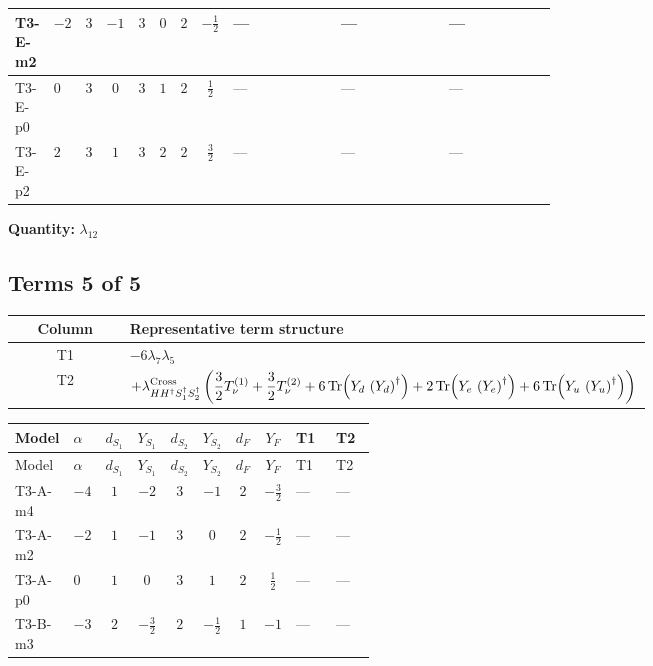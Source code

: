 \documentclass[8pt]{article}
\begin{document}
\begin{landscape}
\begin{longtable}{@{}llcccccc >{\raggedright\arraybackslash}p{0.21\linewidth} >{\raggedright\arraybackslash}p{0.21\linewidth} >{\raggedright\arraybackslash}p{0.21\linewidth}@{}}
\midrule
T3-E-m2 & $-2$ & $3$ & $-1$ & $3$ & $0$ & $2$ & $-\frac{1}{2}$ & --- & --- & --- \\
\midrule
T3-E-p0 & $0$ & $3$ & $0$ & $3$ & $1$ & $2$ & $\frac{1}{2}$ & --- & --- & --- \\
\midrule
T3-E-p2 & $2$ & $3$ & $1$ & $3$ & $2$ & $2$ & $\frac{3}{2}$ & --- & --- & --- \\
\midrule
\bottomrule
\end{longtable}
\clearpage
\noindent\textbf{Quantity: }$\lambda_{12}$\par\smallskip
\subsection*{Terms 5 of 5}
\begin{center}
\begin{tabular}{@{}c >{\raggedright\arraybackslash}p{0.82\linewidth}@{}}
\toprule
Column & Representative term structure \\
\midrule
T1 & \(\displaystyle -6 {\lambda_{7}} {\lambda_5}\) \\
\midrule
T2 & \(\displaystyle +{\lambda_{H H^\dagger S_1^\dagger S_2^\dagger}^{\rm Cross}} \left(\frac{3}{2} T_{\nu}^{(1)}+\frac{3}{2} T_{\nu}^{(2)}+6 \operatorname{Tr}\!\left({Y_d}\,\left({Y_d}\right)^{\dagger}\right)+2 \operatorname{Tr}\!\left({Y_e}\,\left({Y_e}\right)^{\dagger}\right)+6 \operatorname{Tr}\!\left({Y_u}\,\left({Y_u}\right)^{\dagger}\right)\right)\) \\
\midrule
\bottomrule
\end{tabular}
\end{center}
\smallskip
\tiny
\begin{longtable}{@{}llcccccc >{\raggedright\arraybackslash}p{0.21\linewidth} >{\raggedright\arraybackslash}p{0.21\linewidth}@{}}
\toprule
Model & $\alpha$ & $d_{S_1}$ & $Y_{S_1}$ & $d_{S_2}$ & $Y_{S_2}$ & $d_F$ & $Y_F$ & T1 & T2 \\
\midrule
\endfirsthead
\toprule
Model & $\alpha$ & $d_{S_1}$ & $Y_{S_1}$ & $d_{S_2}$ & $Y_{S_2}$ & $d_F$ & $Y_F$ & T1 & T2 \\
\midrule
\endhead
T3-A-m4 & $-4$ & $1$ & $-2$ & $3$ & $-1$ & $2$ & $-\frac{3}{2}$ & --- & --- \\
\midrule
T3-A-m2 & $-2$ & $1$ & $-1$ & $3$ & $0$ & $2$ & $-\frac{1}{2}$ & --- & --- \\
\midrule
T3-A-p0 & $0$ & $1$ & $0$ & $3$ & $1$ & $2$ & $\frac{1}{2}$ & --- & --- \\
\midrule
T3-B-m3 & $-3$ & $2$ & $-\frac{3}{2}$ & $2$ & $-\frac{1}{2}$ & $1$ & $-1$ & --- & --- \\

\end{longtable}
\end{landscape}
\end{document}
